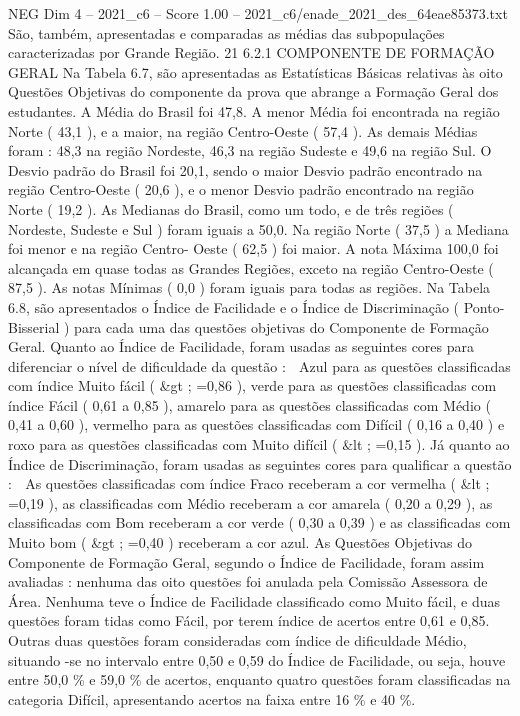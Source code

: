 \begin{textsample}{NEG Dim 4 – 2021\_c6 – Score 1.00 – 2021\_c6/enade\_2021\_des\_64eae85373.txt}
São, também, apresentadas e comparadas as médias das subpopulações caracterizadas por Grande Região. 21 6.2.1 COMPONENTE DE FORMAÇÃO GERAL Na Tabela 6.7, são apresentadas as Estatísticas Básicas relativas às oito Questões Objetivas do componente da prova que abrange a Formação Geral dos estudantes.
A Média do Brasil foi 47,8.
A menor Média foi encontrada na região Norte ( 43,1 ), e a maior, na região Centro-Oeste ( 57,4 ).
As demais Médias foram : 48,3 na região Nordeste, 46,3 na região Sudeste e 49,6 na região Sul.
O Desvio padrão do Brasil foi 20,1, sendo o maior Desvio padrão encontrado na região Centro-Oeste ( 20,6 ), e o menor Desvio padrão encontrado na região Norte ( 19,2 ).
As Medianas do Brasil, como um todo, e de três regiões ( Nordeste, Sudeste e Sul ) foram iguais a 50,0.
Na região Norte ( 37,5 ) a Mediana foi menor e na região Centro- Oeste ( 62,5 ) foi maior.
A nota Máxima 100,0 foi alcançada em quase todas as Grandes Regiões, exceto na região Centro-Oeste ( 87,5 ).
As notas Mínimas ( 0,0 ) foram iguais para todas as regiões.
Na Tabela 6.8, são apresentados o Índice de Facilidade e o Índice de Discriminação ( Ponto-Bisserial ) para cada uma das questões objetivas do Componente de Formação Geral.
Quanto ao Índice de Facilidade, foram usadas as seguintes cores para diferenciar o nível de dificuldade da questão :  Azul para as questões classificadas com índice Muito fácil ( \&gt ; =0,86 ), verde para as questões classificadas com índice Fácil ( 0,61 a 0,85 ), amarelo para as questões classificadas com Médio ( 0,41 a 0,60 ), vermelho para as questões classificadas com Difícil ( 0,16 a 0,40 ) e roxo para as questões classificadas com Muito difícil ( \&lt ; =0,15 ).
Já quanto ao Índice de Discriminação, foram usadas as seguintes cores para qualificar a questão :  As questões classificadas com índice Fraco receberam a cor vermelha ( \&lt ; =0,19 ), as classificadas com Médio receberam a cor amarela ( 0,20 a 0,29 ), as classificadas com Bom receberam a cor verde ( 0,30 a 0,39 ) e as classificadas com Muito bom ( \&gt ; =0,40 ) receberam a cor azul.
As Questões Objetivas do Componente de Formação Geral, segundo o Índice de Facilidade, foram assim avaliadas : nenhuma das oito questões foi anulada pela Comissão Assessora de Área.
Nenhuma teve o Índice de Facilidade classificado como Muito fácil, e duas questões foram tidas como Fácil, por terem índice de acertos entre 0,61 e 0,85.
Outras duas questões foram consideradas com índice de dificuldade Médio, situando -se no intervalo entre 0,50 e 0,59 do Índice de Facilidade, ou seja, houve entre 50,0 \% e 59,0 \% de acertos, enquanto quatro questões foram classificadas na categoria Difícil, apresentando acertos na faixa entre 16 \% e 40 \%.

\end{textsample}
